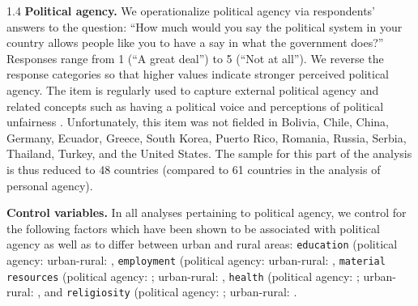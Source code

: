 \documentclass[10pt, letterpaper]{article}
\begin{document}
\begin{spacing}{1.4}
\textbf{Political agency.} We operationalize political agency via respondents' answers to the question: ``How much would you say the political system in your country allows people like you to have a say in what the government does?'' Responses
range from 1 (``A great deal'') to 5 (``Not at all''). We reverse the response categories so that higher values indicate stronger perceived political agency. The item is regularly used to capture external political agency \citep[e.g.,][]{sumino2025,bienstman2024}
and related concepts such as having a political voice \citep{pratsetal2023} and perceptions of political unfairness
 \citep{im2024}. Unfortunately, this item was not fielded in Bolivia, Chile, China, Germany, Ecuador, Greece, South Korea, Puerto Rico, Romania, Russia, Serbia, Thailand, Turkey, and the United States. The sample for this part of the analysis is thus reduced to 48 countries (compared to 61 countries in the analysis of personal agency).



\textbf{Control variables. }
In all analyses pertaining to political agency, we control for the following
factors which have been shown to be associated with political agency as well as
to differ between urban and rural areas: \texttt{education} (political agency:
\citep{emmenegger2015labour,garcia2024they,marx2016unemployed,rowland2024political}
urban-rural: \citep{van2021urban,zahl2024spatial}, \texttt{employment} (political agency:
\citet{emmenegger2015labour,luukkonen2022urbanisation,marx2016unemployed}
urban-rural: \citet{e26,ananian2024employment}, \texttt{material resources} (political agency: 
\citet{emmenegger2015labour,luukkonen2022urbanisation,marx2016unemployed,rowland2024political}; urban-rural:
 \citet{finnemann2024urban,kpatcha2026unlocking,meloni2024rural}, \texttt{health}
 (political agency: \citet{garcia2024they,gidengil2024healthy,shore2019health};
 urban-rural: \citet{mackinnon2023mapping,menashe2022shifting}, and \texttt{religiosity}
 (political agency: \citet{marx2016unemployed,rowland2024political} ;
 urban-rural: \citet{balazka2020mapping,meulemann2020secularization}. 


\end{spacing}
\end{document}
